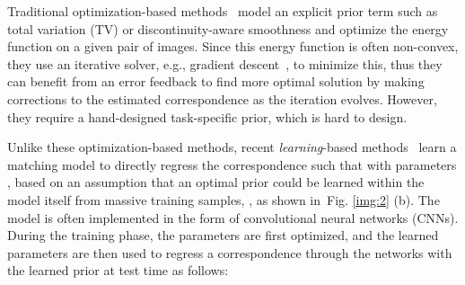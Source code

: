 \documentclass[10pt,twocolumn,letterpaper]{article}
\newcommand{\figref}[1]{Fig. \ref{#1}}
\begin{document}
Traditional optimization-based methods~\cite{liu2010sift,taniai2016joint,ham2016proposal,liu2010sift,ham2016proposal,kim2017dctm} model an explicit prior term such as total variation (TV) or discontinuity-aware smoothness and optimize the energy function on a given pair of images. Since this energy function is often non-convex, they use an iterative solver, e.g., gradient descent~\cite{kingma2014adam}, to minimize this, thus they can benefit from an error feedback to find more optimal solution by making corrections to the estimated correspondence as the iteration evolves. However, they require a hand-designed task-specific prior, which is hard to design.

Unlike these optimization-based methods, recent \emph{learning}-based methods~\cite{rocco2017convolutional,Sun_2018_CVPR,shen2019self,melekhov2019dgc,teed2020raft,truong2020glu} learn a matching model to directly regress the correspondence such that  with parameters , based on an assumption that an optimal prior could be learned within the model itself from massive training samples, , as shown in~\figref{img:2} (b). The model is often implemented in the form of convolutional neural networks (CNNs). During the training phase, the parameters  are first optimized, and the learned parameters are then used to regress a correspondence  through the networks with the learned prior at test time as follows:   
\end{document}
